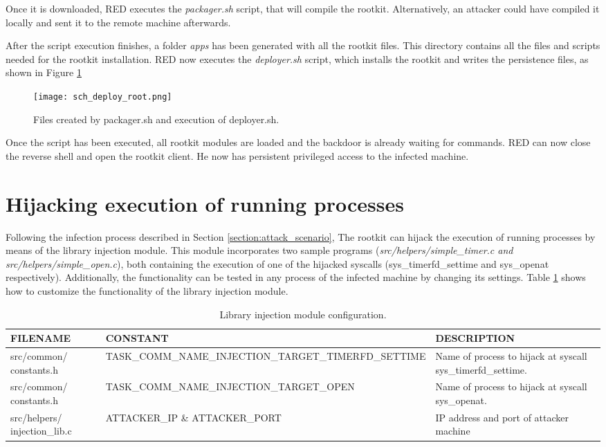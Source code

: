 Once it is downloaded, RED executes the \textit{packager.sh} script, that will compile the rootkit. Alternatively, an attacker could have compiled it locally and sent it to the remote machine afterwards.

After the script execution finishes, a folder \textit{apps} has been generated with all the rootkit files. This directory contains all the files and scripts needed for the rootkit installation. RED now executes the \textit{deployer.sh} script, which installs the rootkit and writes the persistence files, as shown in Figure \ref{fig:deploy_root}

\begin{figure}[htbp]
	\centering
	\texttt{[image: sch\_deploy\_root.png]}
	\caption{Files created by packager.sh and execution of deployer.sh.}
	\label{fig:deploy_root}
\end{figure}

Once the script has been executed, all rootkit modules are loaded and the backdoor is already waiting for commands. RED can now close the reverse shell and open the rootkit client. He now has persistent privileged access to the infected machine.

\section{Hijacking execution of running processes}
Following the infection process described in Section \ref{section:attack_scenario}, The rootkit can hijack the execution of running processes by means of the library injection module. This module incorporates two sample programs (\textit{src/helpers/simple\_timer.c and src/helpers/simple\_open.c}), both containing the execution of one of the hijacked syscalls (sys\_timerfd\_settime and sys\_openat respectively). Additionally, the functionality can be tested in any process of the infected machine by changing its settings. Table \ref{table:lib_injection_config} shows how to customize the functionality of the library injection module.

\begin{table}[htbp]
\begin{tabular}{|>{\centering\arraybackslash}p{2.8cm}|>{\centering\arraybackslash}p{5.2cm}|>{\centering\arraybackslash}p{5.2cm}|}
\hline
\textbf{FILENAME} & \textbf{CONSTANT} & \textbf{DESCRIPTION}\\
\hline
\hline
src/common/ constants.h & TASK\_COMM\_NAME\_INJECTION\_TARGET\_TIMERFD\_SETTIME & Name of process to hijack at syscall sys\_timerfd\_settime.\\
\hline
src/common/ constants.h & TASK\_COMM\_NAME\_INJECTION\_TARGET\_OPEN & Name of process to hijack at syscall sys\_openat.\\
\hline
src/helpers/ injection\_lib.c & ATTACKER\_IP \& ATTACKER\_PORT & IP address and port of attacker machine\\
\hline
\end{tabular}
\caption{Library injection module configuration.}
\label{table:lib_injection_config}
\end{table}

